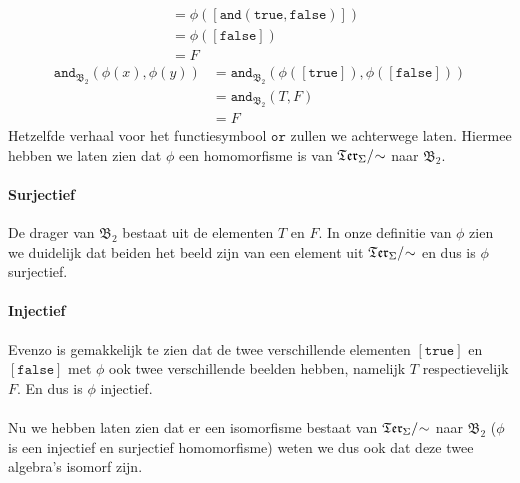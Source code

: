 \documentclass[a4paper,11pt]{article}
\begin{document}
\begin{description}
\begin{align*}
                                                       &= \phi([\texttt{and}(\texttt{true},\texttt{false})]) \\
                                                       &= \phi([\texttt{false}]) \\
                                                       &= F
\end{align*}
\begin{align*}
\texttt{and}_{\mathfrak{B}_{2}}(\phi(x),\phi(y)) &= \texttt{and}_{\mathfrak{B}_{2}}(\phi([\texttt{true}]),\phi([\texttt{false}])) \\
                                                 &= \texttt{and}_{\mathfrak{B}_{2}}(T,F) \\
                                                 &= F
\end{align*}
Hetzelfde verhaal voor het functiesymbool $\texttt{or}$ zullen we achterwege
laten. Hiermee hebben we laten zien dat $\phi$ een homomorfisme is van
$\mathfrak{Ter}_{\Sigma}/\negmedspace\sim$ naar $\mathfrak{B}_{2}$.

\paragraph{Surjectief}

De drager van $\mathfrak{B}_{2}$ bestaat uit de elementen $T$ en $F$. In onze
definitie van $\phi$ zien we duidelijk dat beiden het beeld zijn van een
element uit $\mathfrak{Ter}_{\Sigma}/\negmedspace\sim$ en dus is $\phi$ surjectief.

\paragraph{Injectief}

Evenzo is gemakkelijk te zien dat de twee verschillende elementen
$[\texttt{true}]$ en $[\texttt{false}]$ met $\phi$ ook twee verschillende
beelden hebben, namelijk $T$ respectievelijk $F$. En dus is $\phi$ injectief.

\paragraph{}

Nu we hebben laten zien dat er een isomorfisme bestaat van
$\mathfrak{Ter}_{\Sigma}/\negmedspace\sim$ naar $\mathfrak{B}_{2}$ ($\phi$ is een
injectief en surjectief homomorfisme) weten we dus ook dat deze twee algebra's
isomorf zijn.

\end{description}


\end{document}
